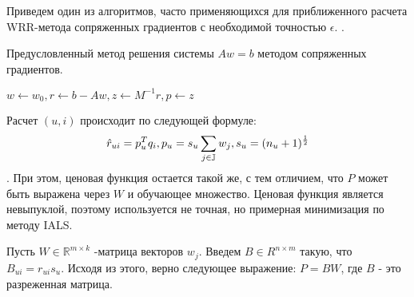 \documentclass[14pt]{mmcs_article}
\begin{document}
Приведем один из алгоритмов, часто применяющихся для приближенного расчета WRR-метода сопряженных градиентов с необходимой точностью $\epsilon$. \cite{ALS:recsys}.

\begin{algorithm}[H]\label{al:1}
	\caption{Предусловленный метод решения системы $Aw = b$ методом сопряженных градиентов.}
	
	$w \leftarrow w_0, r \leftarrow b - Aw, z \leftarrow M^{-1}r, p \leftarrow z$\\
\end{algorithm}

Расчет $(u,i)$ происходит по следующей формуле:
 \begin{equation}\hat{r}_{ui} = p_u^T q_i, \\  p_u = s_u \sum_{j \in \mathbb{J}}w_j,\\ s_u = (n_u + 1)^{\frac{1}{2}}
 \end{equation}. При этом, ценовая функция остается такой же, с тем отличием, что $P$ может быть выражена через $W$ и обучающее множество. Ценовая функция является невыпуклой, поэтому используется не точная, но примерная минимизация по методу IALS.

Пусть $W \in \mathbb{R}^{m \times k}$ -матрица векторов $w_j$.  Введем $B \in R^{n \times m}$ такую, что $B_{ui} = r_{ui}s_u$. Исходя из этого, верно следующее выражение: $P = BW$, где $B$ - это разреженная матрица. 
\end{document}
